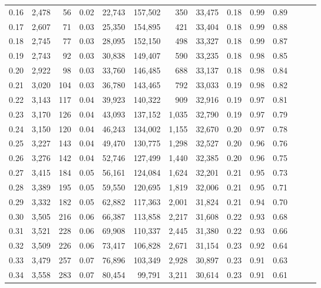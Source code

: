 \begin{tabular}{rrrrrrrrrrrrrr}
0.16 &  2,478 &   56 &  0.02 &   22,743 &  157,502 &     350 &  33,475 &  0.18 &  0.99 &      0.89 \\
0.17 &  2,607 &   71 &  0.03 &   25,350 &  154,895 &     421 &  33,404 &  0.18 &  0.99 &      0.88 \\
0.18 &  2,745 &   77 &  0.03 &   28,095 &  152,150 &     498 &  33,327 &  0.18 &  0.99 &      0.87 \\
0.19 &  2,743 &   92 &  0.03 &   30,838 &  149,407 &     590 &  33,235 &  0.18 &  0.98 &      0.85 \\
0.20 &  2,922 &   98 &  0.03 &   33,760 &  146,485 &     688 &  33,137 &  0.18 &  0.98 &      0.84 \\
0.21 &  3,020 &  104 &  0.03 &   36,780 &  143,465 &     792 &  33,033 &  0.19 &  0.98 &      0.82 \\
0.22 &  3,143 &  117 &  0.04 &   39,923 &  140,322 &     909 &  32,916 &  0.19 &  0.97 &      0.81 \\
0.23 &  3,170 &  126 &  0.04 &   43,093 &  137,152 &   1,035 &  32,790 &  0.19 &  0.97 &      0.79 \\
0.24 &  3,150 &  120 &  0.04 &   46,243 &  134,002 &   1,155 &  32,670 &  0.20 &  0.97 &      0.78 \\
0.25 &  3,227 &  143 &  0.04 &   49,470 &  130,775 &   1,298 &  32,527 &  0.20 &  0.96 &      0.76 \\
0.26 &  3,276 &  142 &  0.04 &   52,746 &  127,499 &   1,440 &  32,385 &  0.20 &  0.96 &      0.75 \\
0.27 &  3,415 &  184 &  0.05 &   56,161 &  124,084 &   1,624 &  32,201 &  0.21 &  0.95 &      0.73 \\
0.28 &  3,389 &  195 &  0.05 &   59,550 &  120,695 &   1,819 &  32,006 &  0.21 &  0.95 &      0.71 \\
0.29 &  3,332 &  182 &  0.05 &   62,882 &  117,363 &   2,001 &  31,824 &  0.21 &  0.94 &      0.70 \\
0.30 &  3,505 &  216 &  0.06 &   66,387 &  113,858 &   2,217 &  31,608 &  0.22 &  0.93 &      0.68 \\
0.31 &  3,521 &  228 &  0.06 &   69,908 &  110,337 &   2,445 &  31,380 &  0.22 &  0.93 &      0.66 \\
0.32 &  3,509 &  226 &  0.06 &   73,417 &  106,828 &   2,671 &  31,154 &  0.23 &  0.92 &      0.64 \\
0.33 &  3,479 &  257 &  0.07 &   76,896 &  103,349 &   2,928 &  30,897 &  0.23 &  0.91 &      0.63 \\
0.34 &  3,558 &  283 &  0.07 &   80,454 &   99,791 &   3,211 &  30,614 &  0.23 &  0.91 &      0.61 \\

\end{tabular}
